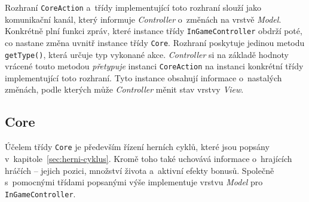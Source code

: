 Rozhraní \texttt{CoreAction} a~třídy implementující toto rozhraní slouží jako komunikační kanál, který informuje \emph{Controller} o~změnách na vrstvě \emph{Model}. Konkrétně plní funkci zpráv, které instance třídy \texttt{InGameController} obdrží poté, co nastane změna uvnitř instance třídy \texttt{Core}. Rozhraní poskytuje jedinou metodu \texttt{getType()}, která určuje typ vykonané akce. \emph{Controller} si na základě hodnoty vrácené touto metodou \emph{přetypuje} instanci \texttt{CoreAction} na instanci konkrétní třídy implementující toto rozhraní. Tyto instance obsahují informace o~nastalých změnách, podle kterých může \emph{Controller} měnit stav vrstvy \emph{View}.

\subsection*{Core}

Účelem třídy \texttt{Core} je především řízení herních cyklů, které jsou popsány v~kapitole~\ref{sec:herni-cyklus}. Kromě toho také uchovává informace o~hrajících hráčích -- jejich pozici, množství života a~aktivní efekty bonusů. Společně s~pomocnými třídami popsanými výše implementuje vrstvu \emph{Model} pro \texttt{InGameController}.

